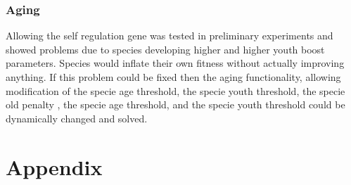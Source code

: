 \documentclass[12pt]{ucthesis} \newif\ifpdf \ifx\pdfoutput\undefined
\begin{document}
\subsection{Aging}

Allowing the self regulation gene was tested in preliminary experiments and
showed problems due to species developing higher and higher youth boost
parameters. Species would inflate their own fitness without actually improving
anything. If this problem could be fixed then the aging functionality, allowing
modification of the specie age threshold, the specie youth threshold, the specie
old penalty , the specie age threshold, and the specie youth threshold could be
dynamically changed and solved.


\clearpage


 
\chapter{Appendix}
\end{document}
